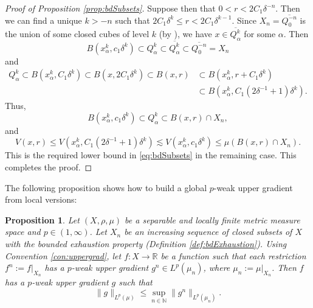 \documentclass[11pt]{amsart}
\newtheorem{proposition}[theorem]{Proposition}
\theoremstyle{definition}
\theoremstyle{remark}
\numberwithin{equation}{section}
\newcommand{\Norm}[2]{\|#1\|_{#2}}
\begin{document}
\begin{proof}[Proof of Proposition \ref{prop:bdSubsets}]
Suppose then that $0<r<2C_1\delta^{-n}$. Then we can find a unique $k>-n$ such that
$2C_1\delta^k\leq r<2C_1\delta^{k-1}$.
Since $X_n=\overline{Q^{-n}_0}$ is the union of some closed cubes of level $k$ (by
\cite[(2.17)]{HK:cubes}), we have $x\in\overline{Q^k_\alpha}$ for some $\alpha$. Then
\begin{equation*}
   B(x^k_\alpha,c_1\delta^k)\subset
   Q^k_\alpha\subset\overline{Q^k_\alpha}\subset\overline{Q^{-n}_0}=X_n
\end{equation*}
and
\begin{equation*}
\begin{split}
  Q^k_\alpha\subset B(x^k_\alpha,C_1\delta^k)
  \subset B(x,2C_1\delta^k)\subset B(x,r)
  &\subset B(x^k_\alpha,r+C_1\delta^k) \\
  &\subset B(x^k_\alpha,C_1(2\delta^{-1}+1)\delta^k).
\end{split}
\end{equation*}
Thus,
\begin{equation*}
  B(x^k_\alpha,c_1\delta^k)\subset Q^k_\alpha\subset B(x,r)\cap X_n,
\end{equation*}
and
\begin{equation*}
  V(x,r)
  \leq V(x^k_\alpha,C_1(2\delta^{-1}+1)\delta^k)
  \lesssim V(x^k_\alpha,c_1\delta^k)
  \leq \mu(B(x,r)\cap X_n).
\end{equation*}
This is the required lower bound in \eqref{eq:bdSubsets} in the remaining case.
This completes the proof.
\end{proof}

The following proposition shows how to build a global $p$-weak upper gradient from local
versions:

\begin{proposition}\label{prop:gluing-ug}
Let $(X,\rho,\mu)$ be a separable and locally finite metric measure space and
$p\in(1,\infty)$. Let $X_n$ be an
increasing sequence of closed subsets of $X$ with the bounded exhaustion property
(Definition \ref{def:bdExhaustion}). Using Convention \ref{con:uppergrad}, let
$f:X\to\mathbb R$ be a function such that each restriction $f^n:=f|_{X_n}$ has a $p$-weak
upper gradient $g^n\in L^p(\mu_n)$, where $\mu_n:=\mu|_{X_n}$. Then $f$ has a $p$-weak upper
gradient $g$ such that
\begin{equation*}
  \Norm{g}{L^p(\mu)}\leq\sup_{n\in\mathbb N}\Norm{g^n}{L^p(\mu_n)}.
\end{equation*}
\end{proposition}
\end{document}
